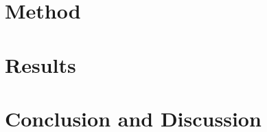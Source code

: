 \documentclass[12pt,
               a4,
               twoside,
               openright]{book} %
\begin{document}
    \chapter{Method}
    \chapter{Results}
    \chapter{Conclusion and Discussion}
    

    \backmatter


    
    

    \finalpageDSV
\end{document}
